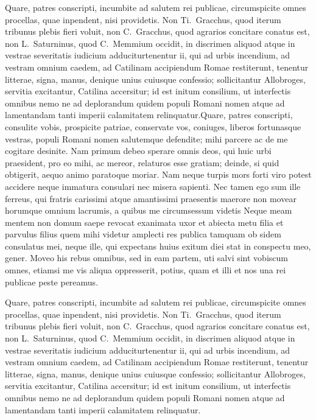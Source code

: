 \documentclass[12pt, a4paper, twoside, english]{report}
\begin{document}
	Quare, patres conscripti, incumbite ad salutem rei publicae,
	circumspicite omnes procellas, quae inpendent, nisi providetis. Non
	Ti.~Gracchus, quod iterum tribunus plebis fieri voluit, non
	C.~Gracchus, quod agrarios concitare conatus est, non L.~Saturninus,
	quod C.~Memmium occidit, in discrimen aliquod atque in vestrae
	severitatis iudicium adduciturtenentur ii, qui ad urbis incendium, ad
	vestram omnium caedem, ad Catilinam accipiendum Romae restiterunt,
	tenentur litterae, signa, manus, denique unius cuiusque confessio;
	sollicitantur Allobroges, servitia excitantur, Catilina accersitur; id
	est initum consilium, ut interfectis omnibus nemo ne ad deplorandum
	quidem populi Romani nomen atque ad lamentandam tanti imperii
	calamitatem relinquatur.Quare, patres conscripti, consulite vobis, prospicite patriae,
	conservate vos, coniuges, liberos fortunasque vestras, populi Romani
	nomen salutemque defendite; mihi parcere ac de me cogitare desinite. Nam
	primum debeo sperare omnis deos, qui huic urbi praesident, pro eo mihi,
	ac mereor, relaturos esse gratiam; deinde, si quid obtigerit, aequo
	animo paratoque moriar. Nam neque turpis mors forti viro potest accidere
	neque immatura consulari nec misera sapienti. Nec tamen ego sum ille
	ferreus, qui fratris carissimi atque amantissimi praesentis maerore non
	movear horumque omnium lacrumis, a quibus me circumsessum videtis Neque
	meam mentem non domum saepe revocat exanimata uxor et abiecta metu filia
	et parvulus filius quem mihi videtur amplecti res publica tamquam ob
	sidem consulatus mei, neque ille, qui expectans huius exitum diei stat
	in conspectu meo, gener. Moveo his rebus omnibus, sed in eam partem, uti
	salvi sint vobiscum omnes, etiamsi me vis aliqua oppresserit, potius,
	quam et illi et nos una rei publicae peste pereamus.
	
	
	
	Quare, patres conscripti, incumbite ad salutem rei publicae,
	circumspicite omnes procellas, quae inpendent, nisi providetis. Non
	Ti.~Gracchus, quod iterum tribunus plebis fieri voluit, non
	C.~Gracchus, quod agrarios concitare conatus est, non L.~Saturninus,
	quod C.~Memmium occidit, in discrimen aliquod atque in vestrae
	severitatis iudicium adduciturtenentur ii, qui ad urbis incendium, ad
	vestram omnium caedem, ad Catilinam accipiendum Romae restiterunt,
	tenentur litterae, signa, manus, denique unius cuiusque confessio;
	sollicitantur Allobroges, servitia excitantur, Catilina accersitur; id
	est initum consilium, ut interfectis omnibus nemo ne ad deplorandum
	quidem populi Romani nomen atque ad lamentandam tanti imperii
	calamitatem relinquatur.
	
	
	
\end{document}
